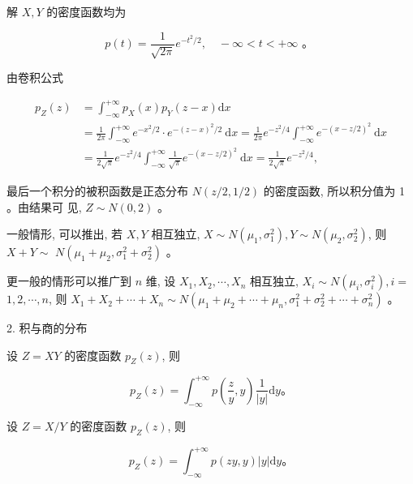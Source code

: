 \documentclass{beamer}
\begin{document}
	\begin{frame}
		解 $X, Y$ 的密度函数均为
		
		$$
		p(t)=\frac{1}{\sqrt{2 \pi}} e^{-t^{2} / 2}, \quad-\infty<t<+\infty \text { 。 }
		$$
		
		由卷积公式
		
		$$
		\begin{aligned}
			p_{Z}(z) & =\int_{-\infty}^{+\infty} p_{X}(x) p_{Y}(z-x) \mathrm{d} x \\
			& =\frac{1}{2 \pi} \int_{-\infty}^{+\infty} e^{-x^{2} / 2} \cdot e^{-(z-x)^{2} / 2} \mathrm{~d} x=\frac{1}{2 \pi} e^{-z^{2} / 4} \int_{-\infty}^{+\infty} e^{-(x-z / 2)^{2}} \mathrm{~d} x \\
			& =\frac{1}{2 \sqrt{\pi}} e^{-z^{2} / 4} \int_{-\infty}^{+\infty} \frac{1}{\sqrt{\pi}} e^{-(x-z / 2)^{2}} \mathrm{~d} x=\frac{1}{2 \sqrt{\pi}} e^{-z^{2} / 4},
		\end{aligned}
		$$
		
		最后一个积分的被积函数是正态分布 $N(z / 2,1 / 2)$ 的密度函数, 所以积分值为 1 。由结果可 见, $Z \sim N(0,2)$ 。
	\end{frame}
	
	\begin{frame}
		一般情形, 可以推出, 若 $X, Y$ 相互独立, $X \sim N\left(\mu_{1}, \sigma_{1}^{2}\right), Y \sim N\left(\mu_{2}, \sigma_{2}^{2}\right)$, 则 $X+Y \sim$ $N\left(\mu_{1}+\mu_{2}, \sigma_{1}^{2}+\sigma_{2}^{2}\right)$ 。
		
		更一般的情形可以推广到 $n$ 维, 设 $X_{1}, X_{2}, \cdots, X_{n}$ 相互独立, $X_{i} \sim N\left(\mu_{i}, \sigma_{i}^{2}\right), i=$ $1,2, \cdots, n$, 则 $X_{1}+X_{2}+\cdots+X_{n} \sim N\left(\mu_{1}+\mu_{2}+\cdots+\mu_{n}, \sigma_{1}^{2}+\sigma_{2}^{2}+\cdots+\sigma_{n}^{2}\right)$ 。
	\end{frame}
	
	\begin{frame}
		2. 积与商的分布
		
		设 $Z=X Y$ 的密度函数 $p_{Z}(z)$, 则
		
		$$
		p_{Z}(z)=\int_{-\infty}^{+\infty} p\left(\frac{z}{y}, y\right) \frac{1}{|y|} \mathrm{d} y 。
		$$
		
		设 $Z=X / Y$ 的密度函数 $p_{Z}(z)$, 则
		
		$$
		p_{Z}(z)=\int_{-\infty}^{+\infty} p(z y, y)|y| \mathrm{d} y 。
		$$
	\end{frame}
	
\end{document}
